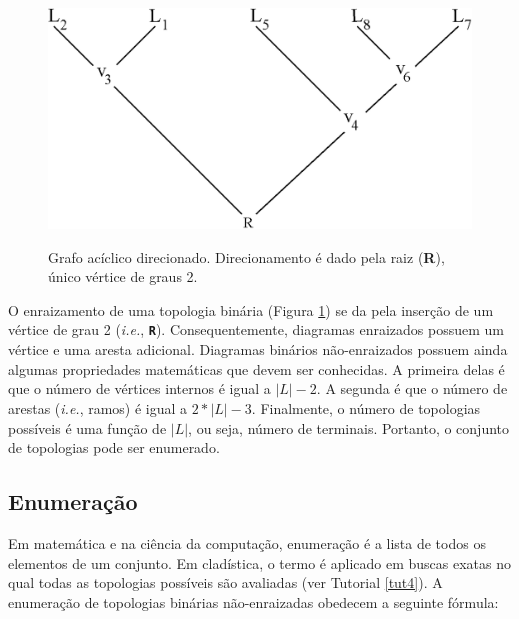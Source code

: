 \begin{refsection}
  \begin{figure}[H]
  \centering
       \centering
      {\includegraphics[scale=0.60]{figures/tut3/directed_graph.eps}}
      {\caption[\textit{Grafos}]{Grafo acíclico direcionado. Direcionamento é dado pela raiz (\textbf{R}), único vértice de graus 2.}\label{tut3:fig:rooted_graph}}
  \end{figure}

	
O enraizamento de uma topologia binária (Figura \ref{tut3:fig:rooted_graph}) se da pela inserção de um vértice de grau 2 (\textit{i.e.}, \textbf{\texttt{R}}). Consequentemente, diagramas enraizados possuem um vértice e uma aresta adicional. Diagramas binários não-enraizados possuem ainda algumas propriedades matemáticas que devem ser conhecidas. A primeira delas é que o número de vértices internos é igual a $|L|-2$. A segunda é que o número de arestas (\textit{i.e.}, ramos) é igual a $2*|L|-3$. Finalmente, o número de topologias possíveis é uma função de $|L|$, ou seja, número de terminais. Portanto, o conjunto de topologias pode ser enumerado.
	
\subsection{Enumeração}\label{tut3:context:enumeration}
Em matemática e na ciência da computação, enumeração é a lista de todos os elementos de um conjunto. Em cladística, o termo é aplicado em buscas exatas no qual todas as topologias possíveis são avaliadas (ver Tutorial \ref{tut4}). A enumeração de topologias binárias não-enraizadas obedecem a seguinte fórmula:


\end{refsection}
